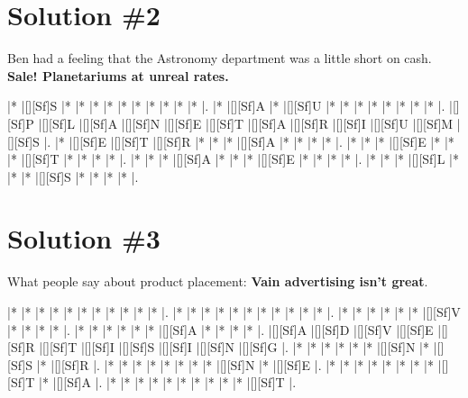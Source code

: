 \documentclass[letterpaper]{article}
\begin{document}
\newpage
\section*{Solution \#2}
Ben had a feeling that the Astronomy department was a little short on cash.
\newline\textbf{Sale! Planetariums at unreal rates.}

\vspace*{1em}
\begin{Puzzle}{12}{8}
|*        |[][Sf]S  |*        |*        |*        |*        |*        |*        |*        |*        |*        |*        |.
|*        |[][Sf]A  |*        |[][Sf]U  |*        |*        |*        |*        |*        |*        |*        |*        |.
|[][Sf]P  |[][Sf]L  |[][Sf]A  |[][Sf]N  |[][Sf]E  |[][Sf]T  |[][Sf]A  |[][Sf]R  |[][Sf]I  |[][Sf]U  |[][Sf]M  |[][Sf]S  |.
|*        |[][Sf]E  |[][Sf]T  |[][Sf]R  |*        |*        |*        |[][Sf]A  |*        |*        |*        |*        |.
|*        |*        |*        |[][Sf]E  |*        |*        |*        |[][Sf]T  |*        |*        |*        |*        |.
|*        |*        |*        |[][Sf]A  |*        |*        |*        |[][Sf]E  |*        |*        |*        |*        |.
|*        |*        |*        |[][Sf]L  |*        |*        |*        |[][Sf]S  |*        |*        |*        |*        |.
\end{Puzzle}

\newpage
\section*{Solution \#3}
What people say about product placement:
\newline\textbf{Vain advertising isn't great}.
\vspace*{1em}
\begin{Puzzle}{11}{9}
|*        |*        |*        |*        |*        |*        |*        |*        |*        |*        |*        |. 
|*        |*        |*        |*        |*        |*        |*        |*        |*        |*        |*        |.  
|*        |*        |*        |*        |*        |*        |[][Sf]V  |*        |*        |*        |*        |.
|*        |*        |*        |*        |*        |*        |[][Sf]A  |*        |*        |*        |*        |.  
|[][Sf]A  |[][Sf]D  |[][Sf]V  |[][Sf]E  |[][Sf]R  |[][Sf]T  |[][Sf]I  |[][Sf]S  |[][Sf]I  |[][Sf]N  |[][Sf]G  |.
|*        |*        |*        |*        |*        |*        |[][Sf]N  |*        |[][Sf]S  |*        |[][Sf]R  |. 
|*        |*        |*        |*        |*        |*        |*        |*        |[][Sf]N  |*        |[][Sf]E  |.
|*        |*        |*        |*        |*        |*        |*        |*        |[][Sf]T  |*        |[][Sf]A  |.
|*        |*        |*        |*        |*        |*        |*        |*        |*        |*        |[][Sf]T  |.
\end{Puzzle}
\end{document}
